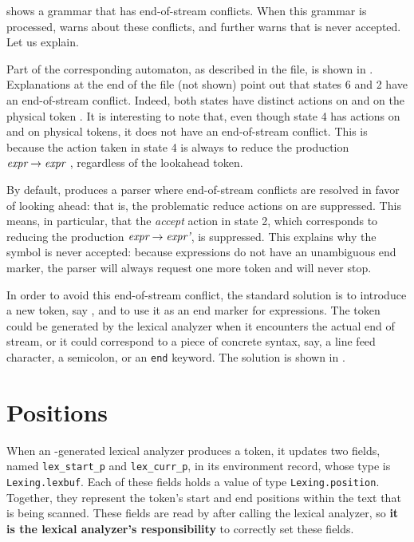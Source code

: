 \documentclass[onecolumn,11pt,nocopyrightspace,preprint]{sigplanconf}
\begin{document}
 shows a grammar that has end-of-stream conflicts.
When this grammar is processed, \menhir warns about these conflicts,
and further warns that  is never accepted. Let us explain.

Part of the corresponding automaton, as described in the \automaton file, is
shown in . Explanations at the end of the \automaton
file (not shown) point out that states 6 and 2 have an end-of-stream
conflict. Indeed, both states have distinct actions on \eos and on the
physical token .
%
It is interesting to note that, even though state 4 has actions on \eos and on
physical tokens, it does not have an end-of-stream conflict. This is because
the action taken in state 4 is always to reduce the production $\textit{expr}
\rightarrow \textit{expr}$  , regardless of the lookahead
token.

By default, \menhir produces a parser where end-of-stream conflicts are
resolved in favor of looking ahead: that is, the problematic reduce actions on
\eos are suppressed. This means, in particular, that the \emph{accept} action
in state 2, which corresponds to reducing the production $\textit{expr}
\rightarrow \textit{expr'}$, is suppressed. This explains why the symbol 
is never accepted: because expressions do not have an unambiguous end marker,
the parser will always request one more token and will never stop.

In order to avoid this end-of-stream conflict, the standard solution is to
introduce a new token, say , and to use it as an end marker for
expressions. The  token could be generated by the lexical analyzer
when it encounters the actual end of stream, or it could correspond to a piece
of concrete syntax, say, a line feed character, a semicolon, or an
\texttt{end} keyword. The solution is shown in .


\section{Positions}
\label{sec:positions}

When an \ocamllex-generated lexical analyzer produces a token, it updates
two fields, named \verb+lex_start_p+ and \verb+lex_curr_p+, in its environment
record, whose type is \verb+Lexing.lexbuf+. Each of these fields holds a value
of type \verb+Lexing.position+. Together, they represent the token's start and
end positions within the text that is being scanned. These fields are read by
\menhir after calling the lexical analyzer, so \textbf{it is the lexical
  analyzer's responsibility} to correctly set these fields.
\end{document}
